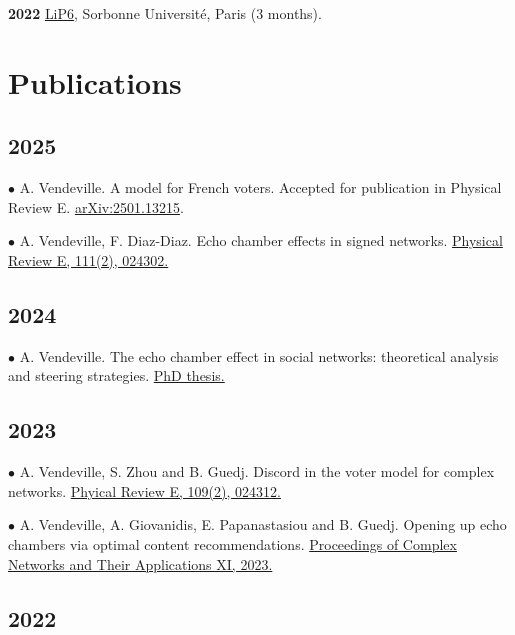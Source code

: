 \documentclass[a4paper,12pt]{article}
\begin{document}

\textbf{2022} \href{https://www.lip6.fr/}{LiP6}, Sorbonne Université, Paris (3 months).


\section*{Publications}

\subsection*{2025}
$\bullet$ A. Vendeville. A model for French voters. Accepted for publication in Physical Review E. \href{https://arxiv.org/abs/2501.13215}{arXiv:2501.13215}.

$\bullet$ A. Vendeville, F. Diaz-Diaz. Echo chamber effects in signed networks. \href{https://doi.org/10.1103/PhysRevE.111.024302}{Physical Review E, 111(2), 024302.}

\subsection*{2024}
$\bullet$ A. Vendeville. The echo chamber effect in social networks: theoretical analysis and steering strategies. \href{https://discovery.ucl.ac.uk/id/eprint/10185036/}{PhD thesis.}

\subsection*{2023}
$\bullet$ A. Vendeville, S. Zhou and B. Guedj. Discord in the voter model for complex networks. \href{https://journals.aps.org/pre/abstract/10.1103/PhysRevE.109.024312}{Phyical Review E, 109(2), 024312.}

$\bullet$ A. Vendeville, A. Giovanidis, E. Papanastasiou and B. Guedj. Opening up echo chambers via optimal content recommendations. \href{https://doi.org/10.1007/978-3-031-21127-0_7}{Proceedings of Complex Networks and Their Applications XI, 2023.}

\subsection*{2022}
\end{document}
